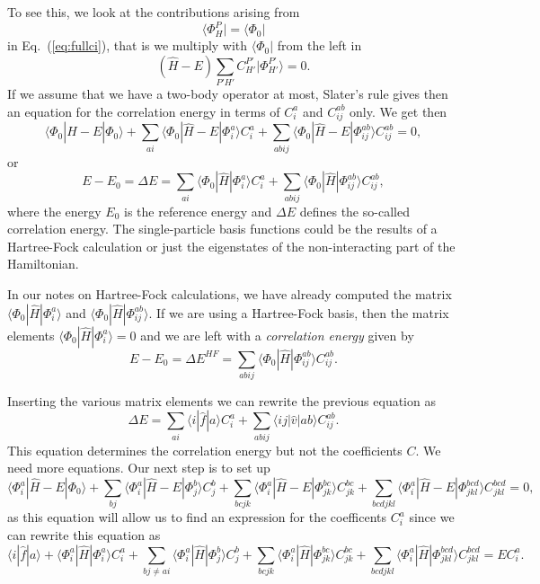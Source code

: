 \documentclass[%
twoside,                 %
final,                   %
10pt]{article}
\begin{document}
To see this, we look at the contributions arising from 
\[
\langle \Phi_H^P | = \langle \Phi_0|
\]
in  Eq.~(\ref{eq:fullci}), that is we multiply with $\langle \Phi_0 |$
from the left in 
\[
(\hat{H} -E)\sum_{P'H'}C_{H'}^{P'}|\Phi_{H'}^{P'} \rangle=0. 
\]
If we assume that we have a two-body operator at most, Slater's rule gives then an equation for the 
correlation energy in terms of $C_i^a$ and $C_{ij}^{ab}$ only.  We get then
\[
\langle \Phi_0 | \hat{H} -E| \Phi_0\rangle + \sum_{ai}\langle \Phi_0 | \hat{H} -E|\Phi_{i}^{a} \rangle C_{i}^{a}+
\sum_{abij}\langle \Phi_0 | \hat{H} -E|\Phi_{ij}^{ab} \rangle C_{ij}^{ab}=0,
\]
or 
\[
E-E_0 =\Delta E=\sum_{ai}\langle \Phi_0 | \hat{H}|\Phi_{i}^{a} \rangle C_{i}^{a}+
\sum_{abij}\langle \Phi_0 | \hat{H}|\Phi_{ij}^{ab} \rangle C_{ij}^{ab},
\]
where the energy $E_0$ is the reference energy and $\Delta E$ defines the so-called correlation energy.
The single-particle basis functions  could be the results of a Hartree-Fock calculation or just the eigenstates of the non-interacting part of the Hamiltonian. 

In our notes on Hartree-Fock calculations, 
we have already computed the matrix $\langle \Phi_0 | \hat{H}|\Phi_{i}^{a}\rangle $ and $\langle \Phi_0 | \hat{H}|\Phi_{ij}^{ab}\rangle$.  If we are using a Hartree-Fock basis, then the matrix elements
$\langle \Phi_0 | \hat{H}|\Phi_{i}^{a}\rangle=0$ and we are left with a \emph{correlation energy} given by
\[
E-E_0 =\Delta E^{HF}=\sum_{abij}\langle \Phi_0 | \hat{H}|\Phi_{ij}^{ab} \rangle C_{ij}^{ab}. 
\]


Inserting the various matrix elements we can rewrite the previous equation as
\[
\Delta E=\sum_{ai}\langle i| \hat{f}|a \rangle C_{i}^{a}+
\sum_{abij}\langle ij | \hat{v}| ab \rangle C_{ij}^{ab}.
\]
This equation determines the correlation energy but not the coefficients $C$. 
We need more equations. Our next step is to set up
\[
\langle \Phi_i^a | \hat{H} -E| \Phi_0\rangle + \sum_{bj}\langle \Phi_i^a | \hat{H} -E|\Phi_{j}^{b} \rangle C_{j}^{b}+
\sum_{bcjk}\langle \Phi_i^a | \hat{H} -E|\Phi_{jk}^{bc} \rangle C_{jk}^{bc}+
\sum_{bcdjkl}\langle \Phi_i^a | \hat{H} -E|\Phi_{jkl}^{bcd} \rangle C_{jkl}^{bcd}=0,
\]
as this equation will allow us to find an expression for the coefficents $C_i^a$ since we can rewrite this equation as 
\[
\langle i | \hat{f}| a\rangle +\langle \Phi_i^a | \hat{H}|\Phi_{i}^{a} \rangle C_{i}^{a}+ \sum_{bj\ne ai}\langle \Phi_i^a | \hat{H}|\Phi_{j}^{b} \rangle C_{j}^{b}+
\sum_{bcjk}\langle \Phi_i^a | \hat{H}|\Phi_{jk}^{bc} \rangle C_{jk}^{bc}+
\sum_{bcdjkl}\langle \Phi_i^a | \hat{H}|\Phi_{jkl}^{bcd} \rangle C_{jkl}^{bcd}=EC_i^a.
\]
\end{document}
